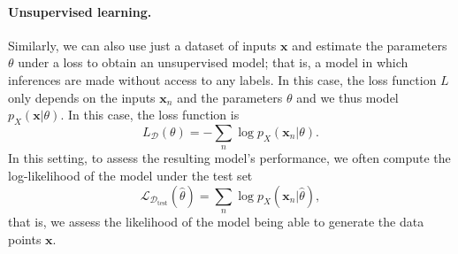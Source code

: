 \paragraph*{Unsupervised learning.} Similarly, we can also use just a
dataset of inputs $\bm{x}$ and estimate the parameters $\theta$ under a loss to
obtain an unsupervised model; that is, a model in which inferences are made
without access to any labels. In this case, the loss function $L$ only
depends on the inputs $\bm{x}_n$ and the parameters $\theta$
and we thus model $p_X(\bm{x}|\theta)$.
In this case, the loss function is
%
\begin{equation}
    L_\mathcal{D}\left(\theta\right)=-\sum_n\log p_X\left(\bm{x}_n|\theta\right).
\end{equation}
%
In this setting, to assess the resulting model's performance,
we often compute the log-likelihood of the model under the test set
%
\begin{equation}
    \mathcal{L}_{\mathcal{D}_\text{test}}(\hat{\theta}) =
    \sum_n\log p_X\left(\bm{x}_n|\hat{\theta}\right),
\end{equation}
%
that is, we assess the likelihood of the model being able to generate
the data points $\bm{x}$.

